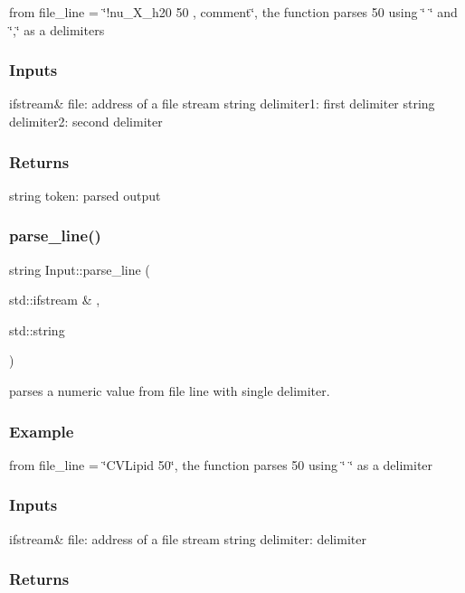 from file\+\_\+line = \char`\"{}!nu\+\_\+\+X\+\_\+h20 50 , comment\char`\"{}, the function parses 50 using \char`\"{} \char`\"{} and \char`\"{},\char`\"{} as a delimiters

\subsubsection*{Inputs }

ifstream\& file\+: address of a file stream string delimiter1\+: first delimiter string delimiter2\+: second delimiter

\subsubsection*{Returns }

string token\+: parsed output\mbox{\label{class_input_a0dda55e6109c2a9e0cea6b845f537e08}} 
\subsubsection{\texorpdfstring{parse\_line()}{parse\_line()}}
{\footnotesize\ttfamily string Input\+::parse\+\_\+line (\begin{DoxyParamCaption}\item[{std\+::ifstream \&}]{,  }\item[{std\+::string}]{ }\end{DoxyParamCaption})}

parses a numeric value from file line with single delimiter.

\subsubsection*{Example }

from file\+\_\+line = \char`\"{}\+C\+V\+Lipid 50\char`\"{}, the function parses 50 using \char`\"{} \char`\"{} as a delimiter

\subsubsection*{Inputs }

ifstream\& file\+: address of a file stream string delimiter\+: delimiter

\subsubsection*{Returns }

